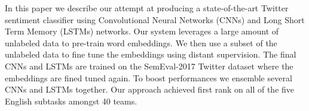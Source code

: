 In this paper we describe our attempt at producing a state-of-the-art Twitter sentiment classifier using Convolutional Neural Networks (CNNs) and Long Short Term Memory (LSTMs) networks.  Our system leverages a large amount of unlabeled data to pre-train word embeddings.  We then use a subset of the unlabeled data to fine tune the embeddings using distant supervision.                          The final CNNs and LSTMs are trained on the SemEval-2017 Twitter dataset where the embeddings are fined tuned again.  To boost performances we ensemble several CNNs and LSTMs together. Our approach achieved first rank on all of the five English subtasks amongst 40 teams.
